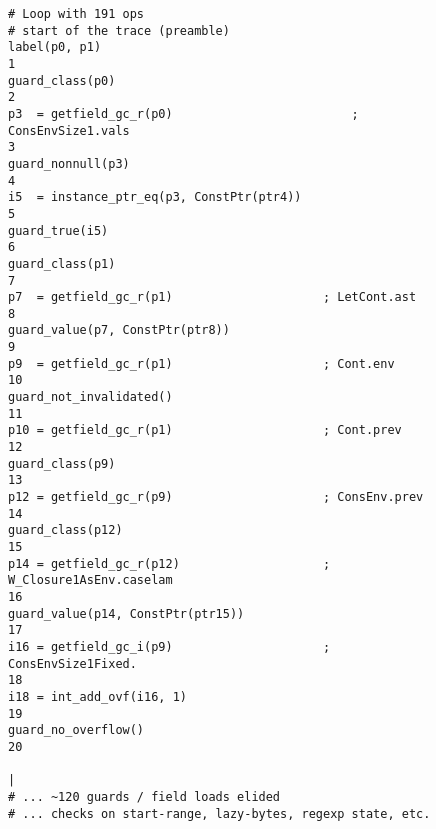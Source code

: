 \begin{figure}[!htbp]
	\centering

\begin{lstlisting}[style=rptrace-style]
# Loop with 191 ops
# start of the trace (preamble)
label(p0, p1)                                                                                                1
guard_class(p0)                                                                                              2
p3  = getfield_gc_r(p0)                         ; ConsEnvSize1.vals                                          3
guard_nonnull(p3)                                                                                            4
i5  = instance_ptr_eq(p3, ConstPtr(ptr4))                                                                    5
guard_true(i5)                                                                                               6
guard_class(p1)                                                                                              7
p7  = getfield_gc_r(p1)                     ; LetCont.ast                                                    8
guard_value(p7, ConstPtr(ptr8))                                                                              9
p9  = getfield_gc_r(p1)                     ; Cont.env                                                       10
guard_not_invalidated()                                                                                      11
p10 = getfield_gc_r(p1)                     ; Cont.prev                                                      12
guard_class(p9)                                                                                              13
p12 = getfield_gc_r(p9)                     ; ConsEnv.prev                                                   14
guard_class(p12)                                                                                             15
p14 = getfield_gc_r(p12)                    ; W_Closure1AsEnv.caselam                                        16
guard_value(p14, ConstPtr(ptr15))                                                                            17
i16 = getfield_gc_i(p9)                     ; ConsEnvSize1Fixed.                                             18
i18 = int_add_ovf(i16, 1)                                                                                    19
guard_no_overflow()                                                                                          20
                                                                                                             |
# ... ~120 guards / field loads elided
# ... checks on start-range, lazy-bytes, regexp state, etc.


\end{lstlisting}
\end{figure}
